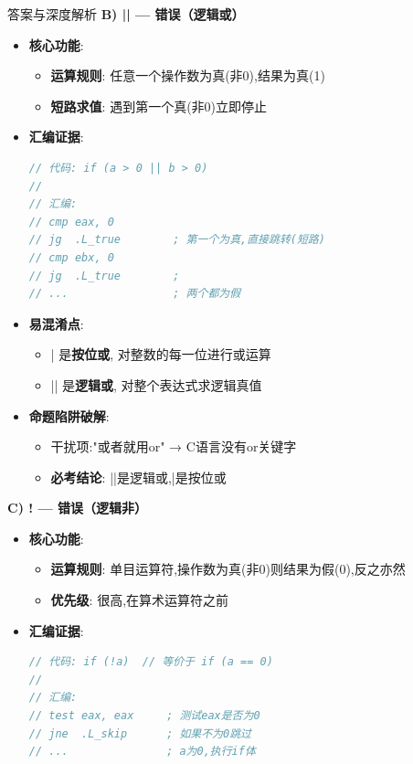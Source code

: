 \documentclass[a4paper,12pt]{article}
\begin{document}
\begin{bluebox}{答案与深度解析}
	\textbf{B) || — 错误（逻辑或）}
	\begin{itemize}[leftmargin=*, nosep]
		\item \textbf{核心功能}:
		      \begin{itemize}
			      \item \textbf{运算规则}: 任意一个操作数为真(非0),结果为真(1)
			      \item \textbf{短路求值}: 遇到第一个真(非0)立即停止
		      \end{itemize}

		\item \textbf{汇编证据}:
		      \begin{lstlisting}[language=C]
// 代码: if (a > 0 || b > 0)
//
// 汇编:
// cmp eax, 0
// jg  .L_true        ; 第一个为真,直接跳转(短路)
// cmp ebx, 0
// jg  .L_true        ;
// ...                ; 两个都为假
    \end{lstlisting}

		\item \textbf{易混淆点}:
		      \begin{itemize}
			      \item | 是\textbf{按位或}, 对整数的每一位进行或运算
			      \item || 是\textbf{逻辑或}, 对整个表达式求逻辑真值
		      \end{itemize}

		\item \textbf{命题陷阱破解}:
		      \begin{itemize}
			      \item 干扰项:"或者就用or" → C语言没有or关键字
			      \item \textbf{必考结论}: ||是逻辑或,|是按位或
		      \end{itemize}
	\end{itemize}

	\textbf{C) ! — 错误（逻辑非）}
	\begin{itemize}[leftmargin=*, nosep]
		\item \textbf{核心功能}:
		      \begin{itemize}
			      \item \textbf{运算规则}: 单目运算符,操作数为真(非0)则结果为假(0),反之亦然
			      \item \textbf{优先级}: 很高,在算术运算符之前
		      \end{itemize}

		\item \textbf{汇编证据}:
		      \begin{lstlisting}[language=C]
// 代码: if (!a)  // 等价于 if (a == 0)
//
// 汇编:
// test eax, eax     ; 测试eax是否为0
// jne  .L_skip      ; 如果不为0跳过
// ...               ; a为0,执行if体
    \end{lstlisting}


\end{itemize}
\end{bluebox}
\end{document}
